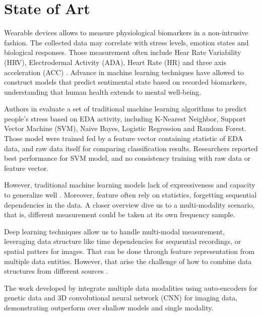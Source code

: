 \section{State of Art}


Wearable devices allows to measure physiological biomarkers in a non-intrusive fashion. The collected data may correlate with stress levels, emotion states and biological responses. Those measurement often include Hear Rate Variability (HRV), Electrodermal Activity (ADA), Heart Rate (HR) and three axis acceleration (ACC) \cite{Vos2023}. Advance in machine learning techniques have allowed to construct models that predict sentimental state based on recorded biomarkers, understanding that human health extends to mental well-being.

Authors in \cite{Zhu2023} evaluate a set of traditional machine learning algorithms to predict people's stress based on EDA activity, including K-Nearest Neighbor, Support Vector Machine (SVM), Naive Bayes, Logistic Regression and Random Forest. Those model were trained fed by a feature vector containing statistic of EDA data, and raw data itself for comparing classification results. Researchers reported best performance for SVM model, and no consistency training with raw data or feature vector.

However, traditional machine learning models lack of expressiveness and capacity to generalize well \cite{Yang2023}. Moreover, feature often rely on statistics, forgetting sequential dependencies in the data. A closer overview dive us to a multi-modality scenario, that is, different measurement could be taken at its own frequency sample.

Deep learning techniques allow us to handle multi-modal measurement, leveraging data structure like time dependencies for sequential recordings, or spatial patters for images. That can be done through feature representation from multiple data entities. However, that arise the challenge of how to combine data structures from different sources \cite{Baltrusaitis2019,Liang2024}. 

The work developed by \cite{Venugopalan2021} integrate multiple data modalities using auto-encoders for genetic data and 3D convolutional neural network (CNN) for imaging data, demonstrating outperform over shallow models and single modality.



